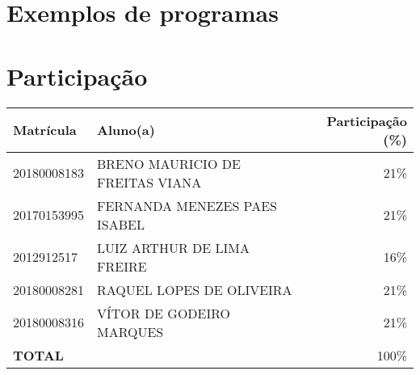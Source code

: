 \documentclass[12pt]{report}
\begin{document}
\newpage
\chapter{Exemplos de programas}


\newpage
\chapter{Participação}
\begin{table}[h]
	\centering
	\label{tab:participation}
	\begin{tabular}{|l|l|r|}
		\hline
		\textbf{Matrícula} & \textbf{Aluno(a)} & \textbf{Participação (\%)} \\ \hline
		20180008183        & BRENO MAURICIO DE FREITAS VIANA & 21\%                       \\ \hline
		20170153995        & FERNANDA MENEZES PAES ISABEL    & 21\%                       \\ \hline
		2012912517         & LUIZ ARTHUR DE LIMA FREIRE      & 16\%                       \\ \hline
		20180008281        & RAQUEL LOPES DE OLIVEIRA        & 21\%                       \\ \hline
		20180008316        & VÍTOR DE GODEIRO MARQUES        & 21\%                       \\ \hline
		\multicolumn{2}{|l|}{\textbf{TOTAL}}            & 100\%                      \\ \hline
	\end{tabular}
\end{table}

\nocite{*}


\end{document}
